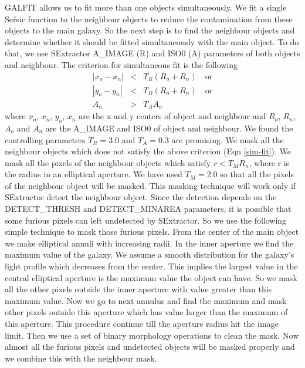 \documentclass[a4paper,10pt]{article}
\begin{document}
GALFIT allows us to fit more than one objects simultaneously.
We fit a single Se\'rsic function to the neighbour objects to reduce the contamination from these objects to the main galaxy.
So the next step is to find the neighbour objects and determine whether it should be fitted simultaneously with the main object.
To do that, we use SExtractor A\_IMAGE (R) and ISO0 (A) parameters of both objects and neighbour.
The criterion for simultaneous fit is the following
\begin{eqnarray}
|x_o - x_n| &<& T_R (R_o + R_n) \quad \textrm{or} \nonumber \\
|y_o - y_n| &<& T_R (R_o + R_n) \quad \textrm{or} \nonumber \\
A_n &>& T_A A_o 
\label{sim-fit}
\end{eqnarray}
where $x_o$, $x_n$, $y_o$, $x_n$ are the x and y centers of object and neighbour and $R_o$, $R_n$, $A_o$ and $A_n$ are the A\_IMAGE and ISO0 of object and neighbour. 
We found the controlling parameters $T_R = 3.0$ and $T_A = 0.3$ are promising.
We mask all the neighbour objects which does not satisfy the above criterion (Eqn \ref{sim-fit}).
We mask all the pixels of the neighbour objects which satisfy $r < T_M R_n$, where r is the radius in an elliptical aperture. 
We have used $T_M = 2.0$ so that all the pixels of the neighbour object will be masked.
This masking technique will work only if SExtractor detect the neighbour object. 
Since the detection depends on the DETECT\_THRESH and DETECT\_MINAREA parameters, it is possible that some furious pixels can left undetected by SExtractor.
So we use the following simple technique to mask those furious pixels.
From the center of the main object we make elliptical annuli with increasing radii.
In the inner aperture we find the maximum value of the galaxy.
We assume a smooth distribution for the galaxy's light profile which decreases from the center.
This implies the largest value in the central elliptical aperture is the maximum value the object can have.
So we mask all the other pixels outside the inner aperture with value greater than this maximum value.
Now we go to next annulus and find the maximum and mask other pixels outside this aperture which has value larger than the maximum of this aperture.
This procedure continue till the aperture radius hit the image limit.
Then we use a set of binary morphology operations to clean the mask.
Now almost all the furious pixels and undetected objects will be masked properly and we combine this with the neighbour mask.
\end{document}
